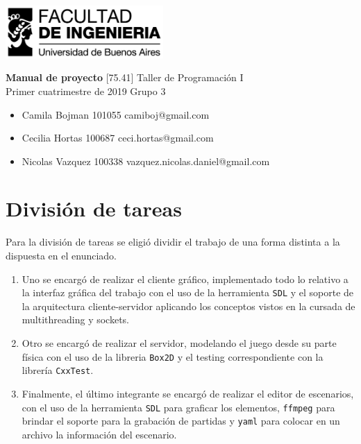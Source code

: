 \documentclass[a4paper]{article}
\newcommand{\materia}{[75.41] Taller de Programación I}
\newcommand{\trabajo}{Manual de proyecto}
\newcommand{\cuatrimestre}{Primer cuatrimestre de 2019}
\newcommand{\grupo}{Grupo 3}
\begin{document}
	\setcounter{page}{1}
	
	\begin{titlepage}
		\hfill\includegraphics[width=6cm]{fiuba.jpeg}
		\begin{center}
			\vfill
			\Huge \textbf{\trabajo}
			\vskip2cm
			\Large \materia\\
			\cuatrimestre
			\vfill
			\grupo
			\begin{itemize}
				\item Camila Bojman 101055 camiboj@gmail.com
				\item Cecilia Hortas 100687 ceci.hortas@gmail.com 
				\item Nicolas Vazquez 100338 vazquez.nicolas.daniel@gmail.com
			\end{itemize}
			\vskip1cm
		\end{center}
	\end{titlepage}

\section{División de tareas}

Para la división de tareas se eligió dividir el trabajo de una forma distinta a la dispuesta en el enunciado.
\begin{enumerate}
	\item Uno se encargó de realizar el cliente gráfico, implementado todo lo relativo a la interfaz gráfica del trabajo con el uso de la herramienta \texttt{SDL} y el soporte de la arquitectura cliente-servidor aplicando los conceptos vistos en la cursada de multithreading y sockets.
	\item Otro se encargó de realizar el servidor, modelando el juego desde su parte física con el uso de la libreria \texttt{Box2D} y el testing correspondiente con la librería \texttt{CxxTest}.
	\item Finalmente, el último integrante se encargó de realizar el editor de escenarios, con el uso de la herramienta \texttt{SDL} para graficar los elementos,  \texttt{ffmpeg} para brindar el soporte para la grabación de partidas y \texttt{yaml} para colocar en un archivo la información del escenario.
\end{enumerate}
\end{document}
